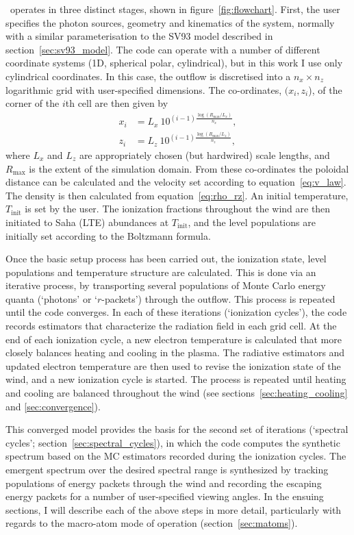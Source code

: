\py\ operates in three distinct stages, shown in figure~\ref{fig:flowchart}. 
First, the user specifies the photon sources,
geometry and kinematics of the system, normally with a similar parameterisation
to the SV93 model described in section~\ref{sec:sv93_model}. 
The code can operate with a number of different coordinate systems 
(1D, spherical polar, cylindrical), but in this work I use only cylindrical coordinates.
In this case, the outflow is discretised into a $n_x \times n_z$ logarithmic grid with 
user-specified dimensions. The co-ordinates, $(x_i, z_i$), 
of the corner of the $i$th cell are then given by
\begin{align}
x_i &= L_{x}~10^{(i-1)\frac{\log (R_{\mathrm{max}} / L_{x})}{n_x}},\\
z_i &= L_{z}~10^{(i-1)\frac{\log (R_{\mathrm{max}} / L_{z})}{n_z}},
\end{align}
where $L_x$ and $L_z$ are appropriately chosen (but hardwired) scale lengths, and $R_{\mathrm{max}}$ 
is the extent of the simulation domain.
From these co-ordinates the poloidal distance can be calculated and
the velocity set according to equation~\ref{eq:v_law}. The density
is then calculated from equation~\ref{eq:rho_rz}. An initial temperature,
$T_{\mathrm{init}}$ is set by the user. The ionization fractions throughout
the wind are then initiated to Saha (LTE) abundances at $T_{\mathrm{init}}$, and the level 
populations are initially set according to the Boltzmann formula.

Once the basic setup process has been carried out, the ionization state,
level populations and temperature structure are calculated.
This is done via an iterative process, by transporting several populations of 
Monte Carlo energy quanta (`photons' or `$r$-packets') through the outflow.
This process is repeated until the code converges. 
In each of these iterations (`ionization cycles'), the code records estimators that 
characterize the radiation field in each grid cell. At the end 
of each ionization cycle, a new electron temperature is calculated
that more closely balances heating and cooling in the 
plasma. The radiative estimators and updated electron
temperature are then used to revise the ionization state of the wind,
and a new ionization cycle is started. The process is repeated until
heating and cooling are balanced throughout the wind (see sections~\ref{sec:heating_cooling}
and \ref{sec:convergence}). 

This converged model provides the basis for the second set of
iterations (`spectral cycles'; section~\ref{sec:spectral_cycles}), 
in which the code computes the synthetic spectrum based on the 
MC estimators recorded during the ionization cycles. 
The emergent spectrum over the desired spectral range is synthesized by 
tracking populations of energy packets through the wind and recording 
the escaping energy packets for
a number of user-specified viewing angles.  In the ensuing sections,
I will describe each of the above steps in more detail, particularly
with regards to the macro-atom mode of operation (section~\ref{sec:matoms}).


